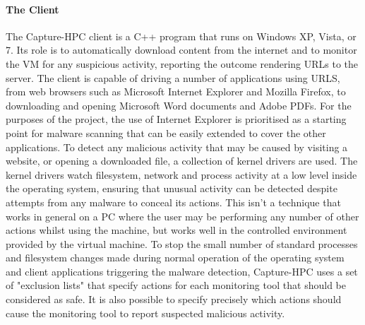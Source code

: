 \paragraph{The Client}
The Capture-HPC client is a C++ program that runs on Windows XP, Vista, or 7.
Its role is to automatically download content from the internet and to monitor
the VM for any
suspicious activity, reporting the outcome rendering URLs to the server. The
client is capable of driving a number of applications using URLS, from web
browsers such as Microsoft Internet Explorer and Mozilla Firefox, to downloading and opening
Microsoft Word documents and Adobe PDFs. For the purposes of the project, the
use of Internet Explorer is prioritised as a starting point for malware scanning
that can be easily extended to cover the other applications. To detect any
malicious activity that may be caused by visiting a website, or opening a
downloaded file, a collection of kernel drivers are used. The kernel drivers
watch filesystem, network and process activity at a low level inside the
operating system, ensuring that
unusual activity can be detected despite attempts from any malware to conceal
its actions. This isn't a technique that works in general on a PC where the user
may be performing any number of other actions whilst using the machine, but
works well in the controlled environment provided by the virtual machine. To
stop the small number of standard processes and filesystem changes made during
normal operation of the operating system and client applications triggering the
malware detection, Capture-HPC uses a set of "exclusion lists" that specify
actions for each monitoring tool that should be considered as safe. It is also
possible to specify precisely which actions should cause the monitoring tool to
report suspected malicious activity.
